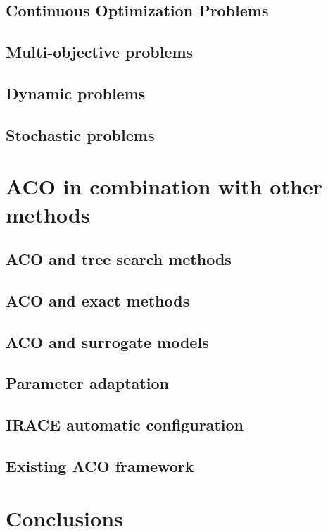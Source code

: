 \documentclass[12pt]{article}
\begin{document}
\subsection{Continuous Optimization Problems}

\subsection{Multi-objective problems}

\subsection{Dynamic problems}

\subsection{Stochastic problems}

\section{ACO in combination with other methods}

\subsection{ACO and tree search methods}

\subsection{ACO and exact methods}

\subsection{ACO and surrogate models}

\subsection{Parameter adaptation}

\subsection{IRACE automatic configuration}

\subsection{Existing ACO framework}

\section{Conclusions}

\begin{thebibliography}{1}

\end{thebibliography}
\end{document}
